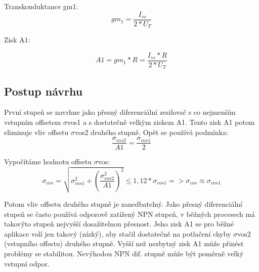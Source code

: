 Transkonduktance gm1:
\begin{equation}
gm_{1} = \frac{I_{ss}}{2*U_{T}}
\end{equation}

Zisk A1:

\begin{equation}
A1 = gm_{1}*R=\frac{I_{ss}*R}{2*U_{T}}
\end{equation}

\newpage
\subsection{Postup návrhu}

První stupeň se navrhne jako přesný diferenciální zesilovač s co nejmenším vstupním offsetem $\sigma$vos1 a s dostatečně velkým ziskem A1. Tento zisk A1 potom eliminuje vliv offsetu $\sigma$vos2 druhého stupně. Opět se používá podmínka:
\begin{equation}
\frac{\sigma_{vos2}}{A1} = \frac{\sigma_{vos1}}{2}
\end{equation}

Vypočítáme hodnotu offsetu $\sigma$vos:
\begin{equation}
\sigma_{vos} = \sqrt{\sigma_{vos1}^2+(\frac{\sigma_{vos2}^2}{A1})^2}\leqslant1,12*\sigma_{vos1}=> \sigma_{vos} \approx \sigma_{vos1}
\end{equation}

Potom vliv offsetu druhého stupně je zanedbatelný. Jako přesný diferenciální stupeň se často používá odporově zatížený NPN stupeň, v běžných procesech má takovýto stupeň nejvyšší dosažitelnou přesnost. Jeho zisk A1 se pro běžné aplikace volí jen takový (nízký), aby stačil dostatečně na potlačení chyby $\sigma$vos2 (vstupního offestu) druhého stupně. Vyšší než nezbytný zisk A1 může přinést problémy se stabilitou. Nevýhodou NPN dif. stupně může být poměrně velký vstupní odpor.

